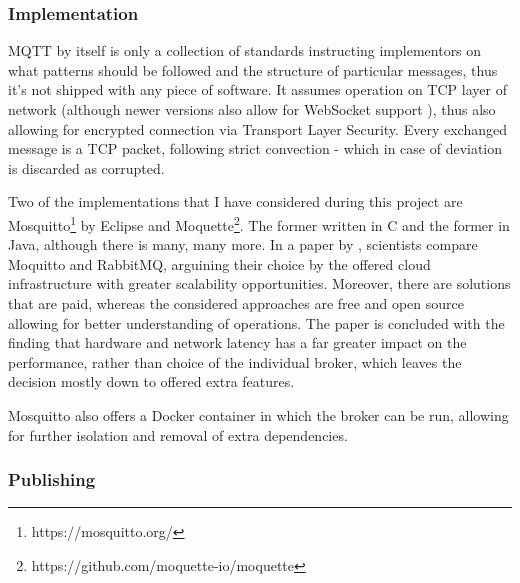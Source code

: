 \subsubsection{\textbf{Implementation}}
MQTT by itself is only a collection of standards instructing implementors on what patterns should be followed and the structure of particular messages, thus it's not shipped with any piece of software. It assumes operation on TCP layer of network (although newer versions also allow for WebSocket support \citep{mijovic2016comparing}), thus also allowing for encrypted connection via Transport Layer Security. Every exchanged message is a TCP packet, following strict convection - which in case of deviation is discarded as corrupted.

Two of the implementations that I have considered during this project are Mosquitto\footnote{https://mosquitto.org/} by Eclipse and Moquette\footnote{https://github.com/moquette-io/moquette}. The former written in C and the former in Java, although there is many, many more. In a paper by \citet{de2019performance}, scientists compare Moquitto and RabbitMQ, arguining their choice by the offered cloud infrastructure with greater scalability opportunities. Moreover, there are solutions that are paid, whereas the considered approaches are free and open source allowing for better understanding of operations. The paper is concluded with the finding that hardware and network latency has a far greater impact on the performance, rather than choice of the individual broker, which leaves the decision mostly down to offered extra features.

Mosquitto also offers a Docker container \cite{light2017mosquitto} in which the broker can be run, allowing for further isolation and removal of extra dependencies.

\subsubsection{\textbf{Publishing}}

